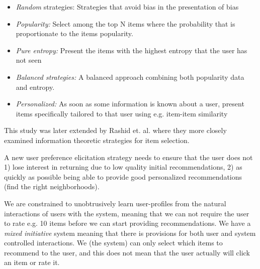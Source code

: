 \begin{itemize}
\item \emph{Random} strategies: Strategies that avoid bias in the presentation of bias
\item \emph{Popularity:} Select among the top N items where the probability that is proportionate to the items popularity.
\item \emph{Pure entropy:} Present the items with the highest entropy that the user has not seen
\item \emph{Balanced strategies:} A balanced approach combining both popularity data and entropy.
\item \emph{Personalized:} As soon as some information is known about a user, present items specifically tailored to that user using e.g. item-item similarity
\end{itemize}

This study was later extended by Rashid et. al. \cite{Rashid2008} where they more closely examined information theoretic strategies for item selection.


A new user preference elicitation strategy needs to ensure that the user does not 1) lose interest in returning due to low quality initial recommendations, 2) as quickly as possible being able to provide good personalized recommendations (find the right neighborhoods).

We are constrained to unobtrusively learn user-profiles from the natural interactions of users with the system, meaning that we can not require the user to rate e.g. 10 items before we can start providing recommendations. We have a \emph{mixed initiative} system meaning that there is provisions for both user and system controlled interactions. We (the system) can only select which items to recommend to the user, and this does not mean that the user actually will click an item or rate it.


